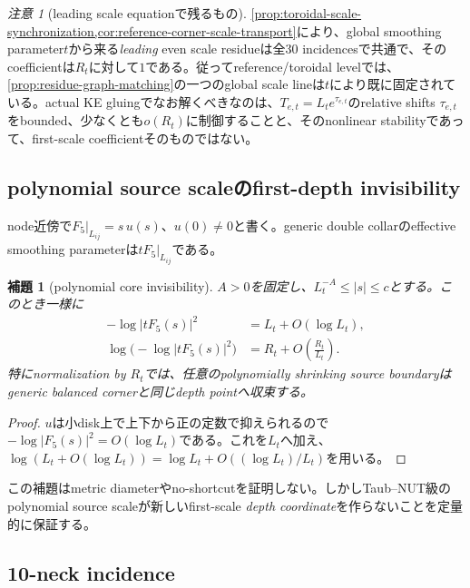 \documentclass[11pt,a4paper]{ltjsarticle}
\newtheorem{lemma}[theorem]{補題}
\theoremstyle{definition}
\theoremstyle{remark}
\newtheorem{remark}[theorem]{注意}
\begin{document}
\begin{remark}[leading scale equationで残るもの]\label{rem:leading-scale-fixed}
\cref{prop:toroidal-scale-synchronization,cor:reference-corner-scale-transport}により、global smoothing parameter$t$から来る\emph{leading} even scale residueは全30 incidencesで共通で、そのcoefficientは$R_t$に対して$1$である。従ってreference/toroidal levelでは、\cref{prop:residue-graph-matching}の一つのglobal scale lineは$t$により既に固定されている。actual KE gluingでなお解くべきなのは、$T_{e,t}=L_t e^{\tau_{e,t}}$のrelative shifts $\tau_{e,t}$をbounded、少なくとも$o(R_t)$に制御することと、そのnonlinear stabilityであって、first-scale coefficientそのものではない。
\end{remark}

\subsection{polynomial source scaleのfirst-depth invisibility}

node近傍で$F_5|_{L_{ij}}=s\,u(s)$、$u(0)\ne0$と書く。generic double collarのeffective smoothing parameterは$tF_5|_{L_{ij}}$である。

\begin{lemma}[polynomial core invisibility]\label{lem:polynomial-invisibility}
$A>0$を固定し、$L_t^{-A}\le|s|\le c$とする。このとき一様に
\begin{align}
 -\log|tF_5(s)|^2&=L_t+O(\log L_t),\label{eq:effective-L}\\
 \log\bigl(-\log|tF_5(s)|^2\bigr)
 &=R_t+O\left(\frac{R_t}{L_t}\right).
\label{eq:effective-R}
\end{align}
特にnormalization by $R_t$では、任意のpolynomially shrinking source boundaryはgeneric balanced cornerと同じdepth pointへ収束する。
\end{lemma}

\begin{proof}
$u$は小disk上で上下から正の定数で抑えられるので
$-\log|F_5(s)|^2=O(\log L_t)$である。これを$L_t$へ加え、
$\log(L_t+O(\log L_t))=\log L_t+O((\log L_t)/L_t)$を用いる。
\end{proof}

この補題はmetric diameterやno-shortcutを証明しない。しかしTaub--NUT級のpolynomial source scaleが新しいfirst-scale \emph{depth coordinate}を作らないことを定量的に保証する。

\subsection{10-neck incidence}
\end{document}
